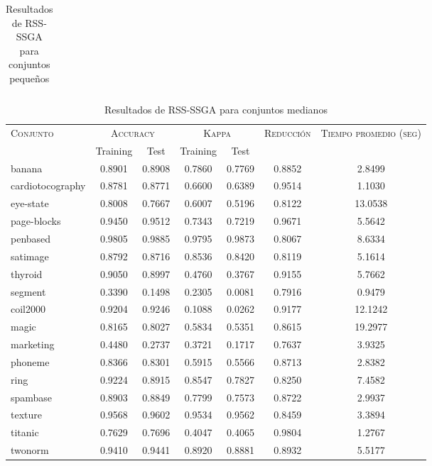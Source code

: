 \begin{table}[]
\begin{tabular}{l c c c c c c}
\hline
\end{tabular}
\caption{Resultados de RSS-SSGA para conjuntos pequeños }
\label{res-peq-RSS-ssga}
\end{table}


\begin{table}[]
\centering
\begin{tabular}{l c c c c c c}
\hline
\multirow{2}{*}{\textsc{Conjunto}}
	& \multicolumn{2}{c}{\textsc{Accuracy}}
	& \multicolumn{2}{c}{\textsc{Kappa}}
	& \textsc{Reducción}
	& \textsc{Tiempo promedio (seg)} \\
	& Training & Test
	& Training & Test \\ 
\hline
\hline

banana & 0.8901 & 0.8908 & 0.7860 & 0.7769 & 0.8852 & 2.8499 \\
cardiotocography & 0.8781 & 0.8771 & 0.6600 & 0.6389 & 0.9514 & 1.1030 \\
eye-state & 0.8008 & 0.7667 & 0.6007 & 0.5196 & 0.8122 & 13.0538 \\
page-blocks & 0.9450 & 0.9512 & 0.7343 & 0.7219 & 0.9671 & 5.5642 \\
penbased & 0.9805 & 0.9885 & 0.9795 & 0.9873 & 0.8067 & 8.6334 \\
satimage & 0.8792 & 0.8716 & 0.8536 & 0.8420 & 0.8119 & 5.1614 \\
thyroid & 0.9050 & 0.8997 & 0.4760 & 0.3767 & 0.9155 & 5.7662 \\
segment & 0.3390 & 0.1498 & 0.2305 & 0.0081 & 0.7916 & 0.9479 \\
coil2000 & 0.9204 & 0.9246 & 0.1088 & 0.0262 & 0.9177 & 12.1242 \\
magic & 0.8165 & 0.8027 & 0.5834 & 0.5351 & 0.8615 & 19.2977 \\
marketing & 0.4480 & 0.2737 & 0.3721 & 0.1717 & 0.7637 & 3.9325 \\
phoneme & 0.8366 & 0.8301 & 0.5915 & 0.5566 & 0.8713 & 2.8382 \\
ring & 0.9224 & 0.8915 & 0.8547 & 0.7827 & 0.8250 & 7.4582 \\
spambase & 0.8903 & 0.8849 & 0.7799 & 0.7573 & 0.8722 & 2.9937 \\
texture & 0.9568 & 0.9602 & 0.9534 & 0.9562 & 0.8459 & 3.3894 \\
titanic & 0.7629 & 0.7696 & 0.4047 & 0.4065 & 0.9804 & 1.2767 \\
twonorm & 0.9410 & 0.9441 & 0.8920 & 0.8881 & 0.8932 & 5.5177 \\

\hline
\end{tabular}
\caption{Resultados de RSS-SSGA para conjuntos medianos }
\label{res-med-RSS-ssga}
\end{table}


